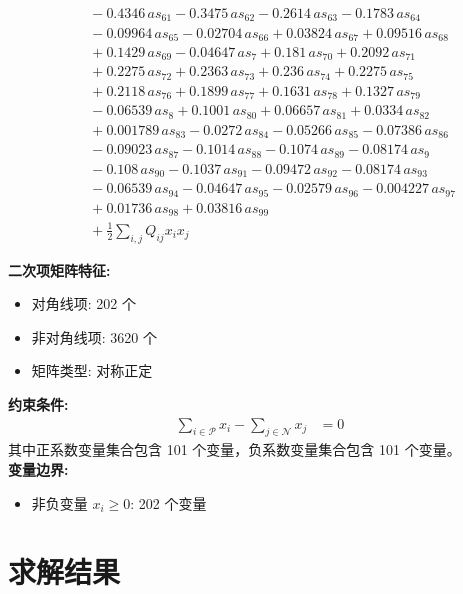\documentclass[a4paper,11pt]{article}
\begin{document}
\begin{align}
&\quad - 0.4346\,as_{61} - 0.3475\,as_{62} - 0.2614\,as_{63} - 0.1783\,as_{64} \nonumber\\
&\quad - 0.09964\,as_{65} - 0.02704\,as_{66} + 0.03824\,as_{67} + 0.09516\,as_{68} \nonumber\\
&\quad + 0.1429\,as_{69} - 0.04647\,as_{7} + 0.181\,as_{70} + 0.2092\,as_{71} \nonumber\\
&\quad + 0.2275\,as_{72} + 0.2363\,as_{73} + 0.236\,as_{74} + 0.2275\,as_{75} \nonumber\\
&\quad + 0.2118\,as_{76} + 0.1899\,as_{77} + 0.1631\,as_{78} + 0.1327\,as_{79} \nonumber\\
&\quad - 0.06539\,as_{8} + 0.1001\,as_{80} + 0.06657\,as_{81} + 0.0334\,as_{82} \nonumber\\
&\quad + 0.001789\,as_{83} - 0.0272\,as_{84} - 0.05266\,as_{85} - 0.07386\,as_{86} \nonumber\\
&\quad - 0.09023\,as_{87} - 0.1014\,as_{88} - 0.1074\,as_{89} - 0.08174\,as_{9} \nonumber\\
&\quad - 0.108\,as_{90} - 0.1037\,as_{91} - 0.09472\,as_{92} - 0.08174\,as_{93} \nonumber\\
&\quad - 0.06539\,as_{94} - 0.04647\,as_{95} - 0.02579\,as_{96} - 0.004227\,as_{97} \nonumber\\
&\quad + 0.01736\,as_{98} + 0.03816\,as_{99} \nonumber\\
&\quad + \frac{1}{2} \sum_{i,j} Q_{ij} x_i x_j\label{eq:objective}
\end{align}

\textbf{二次项矩阵特征:}
\begin{itemize}
\item 对角线项: 202 个
\item 非对角线项: 3620 个
\item 矩阵类型: 对称正定
\end{itemize}

\textbf{约束条件:}
\begin{align}
\sum_{i \in \mathcal{P}} x_i - \sum_{j \in \mathcal{N}} x_j &= 0 \nonumber
\end{align}
其中正系数变量集合包含 101 个变量，负系数变量集合包含 101 个变量。\\[0.3em]

\textbf{变量边界:}
\begin{itemize}
\item 非负变量 $x_i \geq 0$: 202 个变量
\end{itemize}

\section{求解结果}
\end{document}

